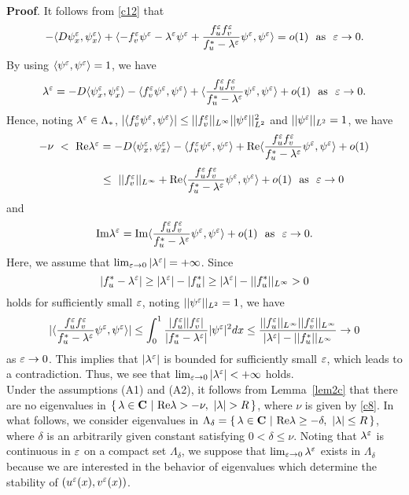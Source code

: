 \documentclass[a4,10pt]{article}
\begin{document}
{\bf Proof}. It follows from \eqref{c12} that
$$
- \langle D \psi^\varepsilon_{x}, \psi^\varepsilon_x \rangle + \langle - f_v^\varepsilon \psi^\varepsilon - \lambda^\varepsilon \psi^\varepsilon
 + \frac{f_u^\varepsilon f_v^\varepsilon }{f_u^* - \lambda^\varepsilon}\psi^\varepsilon, \psi^\varepsilon \rangle = o(1)
\ \ \text{as} \ \ \varepsilon \to 0.
$$
By using $\langle \psi^\varepsilon, \psi^\varepsilon \rangle =1$, we have
%
$$
\lambda^\varepsilon = - D \langle  \psi^\varepsilon_x, \psi^\varepsilon_x \rangle
- \langle f_v^\varepsilon \psi^\varepsilon, \psi^\varepsilon \rangle 
+ \langle \displaystyle\frac{f_u^\varepsilon f_v^\varepsilon }{f_u^* - \lambda^\varepsilon}\psi^\varepsilon, \psi^\varepsilon \rangle + o(1) \ \ \text{as} \ \ \varepsilon \to 0.
$$
%
Hence, noting $\lambda^\varepsilon \in \Lambda_*$,
$| \langle f_v^\varepsilon \psi^\varepsilon, \psi^\varepsilon \rangle | \leq  || f_v^\varepsilon ||_{L^\infty} ||\psi^\varepsilon ||_{L^2}^2$ and  $|| \psi^\varepsilon ||_{L^2} = 1$, we have
$$
\begin{array}{l}
-\nu \ < \ \text{Re}\lambda^\varepsilon = - D \langle  \psi^\varepsilon_x, \psi^\varepsilon_x \rangle
- \langle f_v^\varepsilon \psi^\varepsilon, \psi^\varepsilon \rangle 
+ \text{Re} \langle \displaystyle\frac{f_u^\varepsilon f_v^\varepsilon }{f_u^* - \lambda^\varepsilon}\psi^\varepsilon, \psi^\varepsilon \rangle + o(1) 
\\[3ex]
\ \ \ \ \ \ \ \ \ \ \ \ \ \ \ \ \ \,  \leq   \ || f_v^\varepsilon ||_{L^\infty}  
+ \text{Re}\langle \displaystyle\frac{f_u^\varepsilon f_v^\varepsilon }{f_u^* - \lambda^\varepsilon}\psi^\varepsilon, \psi^\varepsilon \rangle + o(1) \ \ \text{as} \ \ \varepsilon \to 0
\end{array}
$$
%
and
%
$$
\text{Im}\lambda^\varepsilon  =  \text{Im}\langle \displaystyle\frac{f_u^\varepsilon f_v^\varepsilon }{f_u^* - \lambda^\varepsilon}\psi^\varepsilon, \psi^\varepsilon \rangle + o(1) \ \ \text{as} \ \ \varepsilon \to 0.
$$
%
Here, we assume that $\lim_{\varepsilon \to 0} |\lambda^\varepsilon| = +\infty$. 
Since
$$
| f_u^* - \lambda^\varepsilon| \geq |\lambda^\varepsilon| - | f_u^*| \geq |\lambda^\varepsilon| -
|| f_u^* ||_{L^\infty} > 0
$$
holds for sufficiently small $\varepsilon$, noting $|| \psi^\varepsilon ||_{L^2} = 1$, we have
$$
| \langle \displaystyle\frac{f_u^\varepsilon f_v^\varepsilon }{f_u^* - \lambda^\varepsilon}\psi^\varepsilon, \psi^\varepsilon \rangle |
\leq \int_0^1 \displaystyle\frac{|f_u^\varepsilon | |f_v^\varepsilon| }{|f_u^* - \lambda^\varepsilon|} |\psi^\varepsilon|^2 dx
\leq \displaystyle\frac{ ||f_u^\varepsilon ||_{L^\infty}  ||f_v^\varepsilon||_{L^\infty}  }{ |\lambda^\varepsilon| -
|| f_u^* ||_{L^\infty} } \to 0
$$
as $\varepsilon \to 0$. This implies that $|\lambda^\varepsilon|$ is bounded for sufficiently small 
$\varepsilon$, which leads to a contradiction. Thus,
we see that $\lim_{\varepsilon \to 0} |\lambda^\varepsilon| < +\infty$ holds. \Qed \\


Under the assumptions (A1) and (A2), 
it follows from Lemma~\ref{lem2c} that there are no eigenvalues in $
\{ \, \lambda \in \mbox{\bf C} \ | \ \text{Re} \lambda > -\nu, \  |\lambda| > R \, \}$,
where $\nu$ is given by \eqref{c8}.
In what follows, we consider eigenvalues in 
$\Lambda_\delta = \{ \, \lambda \in \mbox{\bf C} \ | \ \text{Re} \lambda \geq -\delta, \ |\lambda| \leq R \, \}$, where $\delta$ 
is an arbitrarily given constant satisfying $0 < \delta \leq \nu$.
Noting that $\lambda^\varepsilon$ is continuous in $\varepsilon$ on a compact set 
$\Lambda_\delta$, we suppose that $\lim_{\varepsilon \to 0} \lambda^\varepsilon$ exists in $ \Lambda_\delta$ because we are interested in the behavior of eigenvalues which 
determine the stability of $(u^\varepsilon(x), v^\varepsilon(x))$.
\end{document}
